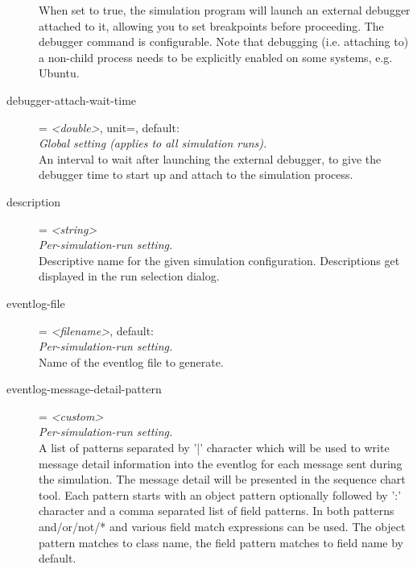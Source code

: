 \begin{description}
    When set to true, the simulation program will launch an external debugger
    attached to it, allowing you to set breakpoints before proceeding. The
    debugger command is configurable.  Note that debugging (i.e. attaching to)
    a non-child process needs to be explicitly enabled on some systems, e.g.
    Ubuntu.
\item[debugger-attach-wait-time] = \textit{<double>}, unit=, default: \\
    \textit{Global setting (applies to all simulation runs).}\\
    An interval to wait after launching the external debugger, to give the
    debugger time to start up and attach to the simulation process.
\item[description] = \textit{<string>}\\
    \textit{Per-simulation-run setting.}\\
    Descriptive name for the given simulation configuration. Descriptions get
    displayed in the run selection dialog.
\item[eventlog-file] = \textit{<filename>}, default: \\
    \textit{Per-simulation-run setting.}\\
    Name of the eventlog file to generate.
\item[eventlog-message-detail-pattern] = \textit{<custom>}\\
    \textit{Per-simulation-run setting.}\\
    A list of patterns separated by '|' character which will be used to write
    message detail information into the eventlog for each message sent during
    the simulation. The message detail will be presented in the sequence chart
    tool. Each pattern starts with an object pattern optionally followed by ':'
    character and a comma separated list of field patterns. In both patterns
    and/or/not/* and various field match expressions can be used. The object
    pattern matches to class name, the field pattern matches to field name by
    default.\\ 
    \\  
\end{description}
